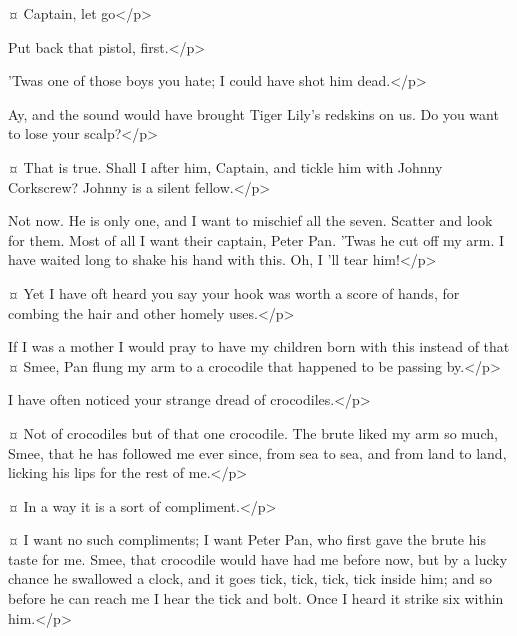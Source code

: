\begin{drama}

\starkeyspeaks {}¤
Captain, let go</p>

\hookspeaks
Put back that pistol, first.</p>

\starkeyspeaks
'Twas one of those boys you hate; I could have shot him dead.</p>

\hookspeaks
Ay, and the sound would have brought Tiger Lily's redskins on us.
Do you want to lose your scalp?</p>

\smeespeaks {}¤
That is true.
Shall I after him, Captain, and tickle him with Johnny Corkscrew?
Johnny is a silent fellow.</p>

\hookspeaks
Not now.
He is only one, and I want to mischief all the seven.
Scatter and look for them.
Most of all I want their captain, Peter Pan.
'Twas he cut off my arm.
I have waited long to shake his hand with this.
Oh, I 'll tear him!</p>

\smeespeaks {}¤
Yet I have oft heard you say your hook was worth a score of hands, for combing the hair and other homely uses.</p>

\hookspeaks
If I was a mother I would pray to have my children born with this instead of that
¤
Smee, Pan flung my arm to a crocodile that happened to be passing by.</p>

\smeespeaks
I have often noticed your strange dread of crocodiles.</p>

\hookspeaks {}¤
Not of crocodiles but of that one crocodile.
The brute liked my arm so much, Smee, that he has followed me ever since, from sea to sea, and from land to land, licking his lips for the rest of me.</p>

\smeespeaks {}¤
In a way it is a sort of compliment.</p>

\hookspeaks {}¤
I want no such compliments; I want Peter Pan, who first gave the brute his taste for me.
Smee, that crocodile would have had me before now, but by a lucky chance he swallowed a clock, and it goes tick, tick, tick, tick inside him; and so before he can reach me I hear the tick and bolt.
Once I heard it strike six within him.</p>


\end{drama}
